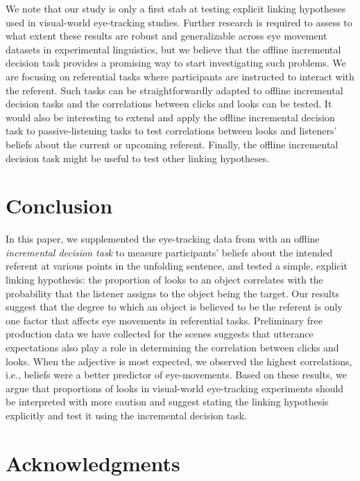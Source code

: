 \documentclass[10pt,letterpaper]{article}
\begin{document}
We note that our study is only a first stab at testing explicit linking hypotheses used in visual-world
 eye-tracking studies.
Further research is required to assess to what extent these results are robust and generalizable across eye movement datasets in experimental linguistics, 
but we believe that the offline incremental decision task provides a promising way to start investigating such 
problems.
We are focusing on referential tasks where participants are instructed to interact with the referent.
Such tasks can be straightforwardly adapted to offline incremental decision tasks and the correlations between
 clicks and looks can be tested.
It would also be interesting to extend and apply the offline incremental decision task to
 passive-listening  tasks to test correlations between looks and listeners' beliefs about the current 
 or upcoming referent.
Finally, the offline incremental decision task might be useful to test other linking hypotheses.



\section{Conclusion}

In this paper, we supplemented the eye-tracking data from  with an offline \emph{incremental decision task} to
measure participants’ beliefs about the intended referent at various points in the unfolding sentence, 
and tested a simple, explicit linking hypothesis: the proportion of looks to an object correlates with the probability that the listener assigns to the object being the target.
Our results suggest that the degree to which an object is believed to be the referent is only one factor that affects eye movements in referential tasks. Preliminary free production data we have collected for the scenes suggests that utterance expectations also play a role in determining the correlation between clicks and looks.
When the adjective is most expected, we observed the highest correlations, i.e., 
beliefs were a better predictor of eye-movements. 
Based on these results, we argue that proportions of looks in visual-world eye-tracking experiments should be 
 interpreted with more caution and suggest stating the linking hypothesis explicitly and test it 
 using the incremental decision task.



\section{Acknowledgments}
\end{document}
